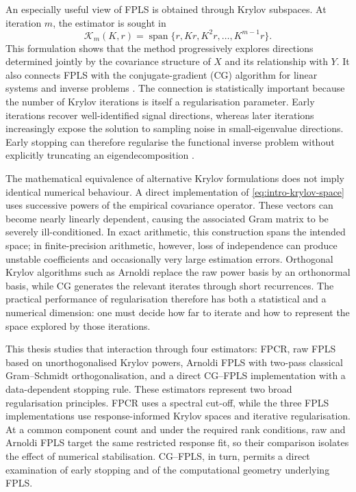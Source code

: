 An especially useful view of FPLS is obtained through Krylov subspaces. At iteration $m$, the estimator is sought in
\begin{equation}
    \mathcal{K}_m(K,r)
    =\operatorname{span}\{r,Kr,K^2r,\ldots,K^{m-1}r\}.
    \label{eq:intro-krylov-space}
\end{equation}
This formulation shows that the method progressively explores directions determined jointly by the covariance structure of $X$ and its relationship with $Y$. It also connects FPLS with the conjugate-gradient (CG) algorithm for linear systems and inverse problems \parencite{hestenes_stiefel_1952,phatak_dehoog_2002,babii_carrasco_tsafack_2026}. The connection is statistically important because the number of Krylov iterations is itself a regularisation parameter. Early iterations recover well-identified signal directions, whereas later iterations increasingly expose the solution to sampling noise in small-eigenvalue directions. Early stopping can therefore regularise the functional inverse problem without explicitly truncating an eigendecomposition \parencite{blanchard_kramer_2016,babii_carrasco_tsafack_2026}.

The mathematical equivalence of alternative Krylov formulations does not imply identical numerical behaviour. A direct implementation of \eqref{eq:intro-krylov-space} uses successive powers of the empirical covariance operator. These vectors can become nearly linearly dependent, causing the associated Gram matrix to be severely ill-conditioned. In exact arithmetic, this construction spans the intended space; in finite-precision arithmetic, however, loss of independence can produce unstable coefficients and occasionally very large estimation errors. Orthogonal Krylov algorithms such as Arnoldi replace the raw power basis by an orthonormal basis, while CG generates the relevant iterates through short recurrences. The practical performance of regularisation therefore has both a statistical and a numerical dimension: one must decide how far to iterate and how to represent the space explored by those iterations.

This thesis studies that interaction through four estimators: FPCR, raw FPLS based on unorthogonalised Krylov powers, Arnoldi FPLS with two-pass classical Gram--Schmidt orthogonalisation, and a direct CG--FPLS implementation with a data-dependent stopping rule. These estimators represent two broad regularisation principles. FPCR uses a spectral cut-off, while the three FPLS implementations use response-informed Krylov spaces and iterative regularisation. At a common component count and under the required rank conditions, raw and Arnoldi FPLS target the same restricted response fit, so their comparison isolates the effect of numerical stabilisation. CG--FPLS, in turn, permits a direct examination of early stopping and of the computational geometry underlying FPLS.

